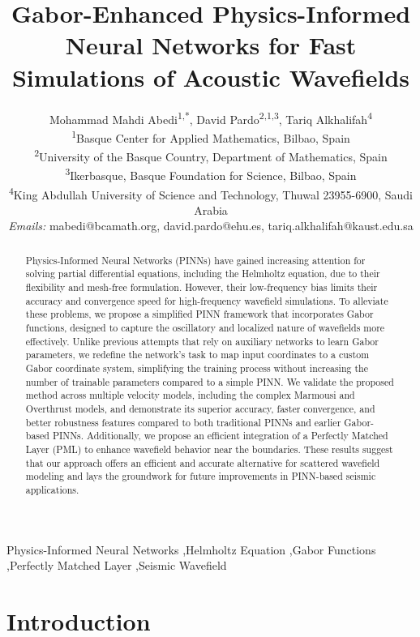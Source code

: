 \documentclass[authoryear, preprint, 12pt]{elsarticle}
\title{Gabor-Enhanced Physics-Informed Neural Networks for Fast Simulations of Acoustic Wavefields}
\author{
	\normalsize Mohammad Mahdi Abedi\textsuperscript{1,*}\corref{cor1},  
	David Pardo\textsuperscript{2,1,3},  
	Tariq Alkhalifah\textsuperscript{4} \\  
	\footnotesize  
	\textsuperscript{1}Basque Center for Applied Mathematics, Bilbao, Spain \\  
	\footnotesize  
	\textsuperscript{2}University of the Basque Country, Department of Mathematics, Spain \\  
	\footnotesize  
	\textsuperscript{3}Ikerbasque, Basque Foundation for Science, Bilbao, Spain \\  
	\footnotesize  
	\textsuperscript{4}King Abdullah University of Science and Technology, Thuwal 23955-6900, Saudi Arabia \\  
	\footnotesize  
	\textit{Emails:} mabedi@bcamath.org, david.pardo@ehu.es, tariq.alkhalifah@kaust.edu.sa  
}
\begin{document}
	
	\begin{frontmatter}
		
		\begin{abstract}
			Physics-Informed Neural Networks (PINNs) have gained increasing attention for solving partial differential equations, including the Helmholtz equation, due to their flexibility and mesh-free formulation. However, their low-frequency bias limits their accuracy and convergence speed for high-frequency wavefield simulations. To alleviate these problems, we propose a simplified PINN framework that incorporates Gabor functions, designed to capture the oscillatory and localized nature of wavefields more effectively. Unlike previous attempts that rely on auxiliary networks to learn Gabor parameters, we redefine the network's task to map input coordinates to a custom Gabor coordinate system, simplifying the training process without increasing the number of trainable parameters compared to a simple PINN. We validate the proposed method across multiple velocity models, including the complex Marmousi and Overthrust models, and demonstrate its superior accuracy, faster convergence, and better robustness features compared to both traditional PINNs and earlier Gabor-based PINNs. Additionally, we propose an efficient integration of a Perfectly Matched Layer (PML) to enhance wavefield behavior near the boundaries. These results suggest that our approach offers an efficient and accurate alternative for scattered wavefield modeling and lays the groundwork for future improvements in PINN-based seismic applications.
		\end{abstract}
		
		\begin{keyword}
			Physics-Informed Neural Networks \sep Helmholtz Equation \sep Gabor Functions \sep Perfectly Matched Layer \sep Seismic Wavefield 
		\end{keyword}
		
	\end{frontmatter}
	
	\graphicspath{{figures/}}
	
	\section{Introduction}
	
\end{document}
